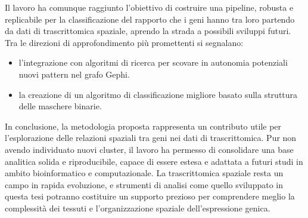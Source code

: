 \medskip
Il lavoro ha comunque raggiunto l'obiettivo di costruire una pipeline, robusta e replicabile per la classificazione del rapporto che i geni hanno tra loro partendo da dati di trascrittomica spaziale, aprendo la strada a possibili sviluppi futuri.  
Tra le direzioni di approfondimento più promettenti si segnalano:
\begin{itemize}
  \item l'integrazione con algoritmi di ricerca per scovare in autonomia potenziali nuovi pattern nel grafo Gephi.
  \item la creazione di un algoritmo di classificazione migliore basato sulla struttura delle maschere binarie.
\end{itemize}

\medskip
In conclusione, la metodologia proposta rappresenta un contributo utile per l'esplorazione delle relazioni spaziali tra geni nei dati di trascrittomica.  
Pur non avendo individuato nuovi cluster, il lavoro ha permesso di consolidare una base analitica solida e riproducibile, capace di essere estesa e adattata a futuri studi in ambito bioinformatico e computazionale.  
La trascrittomica spaziale resta un campo in rapida evoluzione, e strumenti di analisi come quello sviluppato in questa tesi potranno costituire un supporto prezioso per comprendere meglio la complessità dei tessuti e l'organizzazione spaziale dell'espressione genica.
